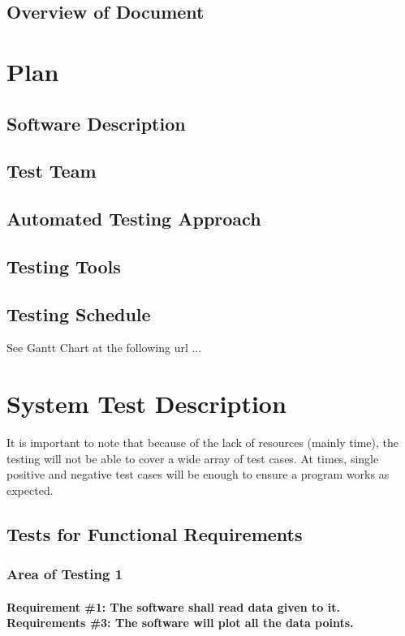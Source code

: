 \documentclass[12pt, titlepage]{article}
\begin{document}
\subsection{Overview of Document}
\section{Plan}
	
\subsection{Software Description}
\subsection{Test Team}
\subsection{Automated Testing Approach}
\subsection{Testing Tools}
\subsection{Testing Schedule}
		
See Gantt Chart at the following url ...
\section{System Test Description}

It is important to note that because of the lack of resources (mainly time), the testing will not be able to cover a wide array of test cases. At times, single positive and negative test cases will be enough to ensure a program works as expected. 	
\subsection{Tests for Functional Requirements}

\subsubsection{Area of Testing 1}		
	\label{sec:3.1.1}
	\paragraph{Requirement \#1: The software shall read data given to it. \\ Requirements \#3: The software will plot all the data points.}
\end{document}
